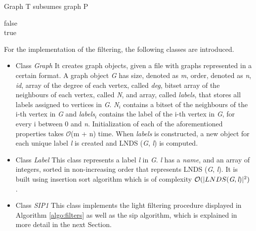 \documentclass{l4proj}
\begin{document}
\begin{algorithm}
\centering
\caption{Graph T subsumes graph P}
\label{algo:subsumes}
\begin{algorithmic}[1]
		 \Return false
		\EndIf
	\EndFor
\EndFor \\
\Return true
\EndProcedure
\end{algorithmic}
\end{algorithm}
For the implementation of the filtering, the following classes are introduced.

\begin{itemize}
\item Class \emph{Graph}
It creates graph objects, given a file with graphs represented in a certain format. A graph object \emph{G} has size, denoted as \emph{m}, order, denoted as \emph{n}, \emph{id}, array of the degree of each vertex, called \emph{deg}, bitset array of the neighbours of each vertex, called \emph{N}, and array, called \emph{labels}, that stores all labels assigned to vertices in \emph{G}. \emph{N}$_{i}$ contains a bitset of the neighbours of the i-th vertex in \emph{G} and \emph{labels}$_{i}$ contains the label of the i-th vertex in \emph{G}, for every i between 0 and \emph{n}. Initialization of each of the aforementioned properties takes $\mathcal{O}$(m + n) time. When \emph{labels} is constructed, a new object for each unique label \emph{l} is created and LNDS (\emph{G}, \emph{l}) is computed.

\item Class \emph{Label}
This class represents a label \emph{l} in \emph{G}. \emph{l} has a \emph{name}, and an array of integers, sorted in non-increasing order that represents LNDS (\emph{G}, \emph{l}). It is built using insertion sort algorithm which is of complexity $\mathcal{O}(|LNDS (\emph{G}, \emph{l})|^{2})$ \cite{Cormen:2001:IA:580470}.

\item Class \emph{SIP1}
This class implements the light filtering procedure displayed in Algorithm \ref{algo:filters} as well as the \gls{sip} algorithm, which is explained in more detail in the next Section.
\end{itemize}
\end{document}
